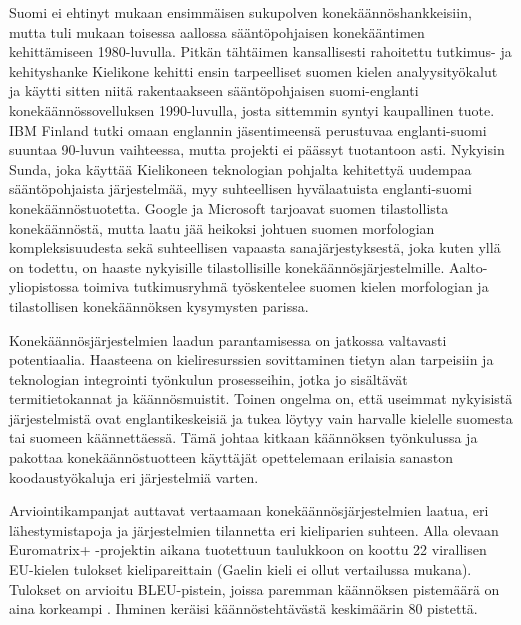 \documentclass[]{../../metanetpaper}
\begin{document}
\begin{Parallel}[c]{70mm}{70mm}
{%

Suomi ei ehtinyt mukaan ensimmäisen sukupolven konekäännöshankkeisiin,
mutta tuli mukaan toisessa aallossa sääntöpohjaisen konekääntimen
kehittämiseen 1980-luvulla. Pitkän tähtäimen kansallisesti rahoitettu
tutkimus- ja kehityshanke Kielikone kehitti ensin tarpeelliset suomen
kielen analyysityökalut ja käytti sitten niitä rakentaakseen
sääntöpohjaisen suomi-englanti konekäännössovelluksen 1990-luvulla,
josta sittemmin syntyi kaupallinen tuote. IBM Finland tutki omaan
englannin jäsentimeensä perustuvaa englanti-suomi suuntaa 90-luvun
vaihteessa, mutta projekti ei päässyt tuotantoon asti. Nykyisin Sunda,
joka käyttää Kielikoneen teknologian pohjalta kehitettyä uudempaa
sääntöpohjaista järjestelmää, myy suhteellisen hyvälaatuista
englanti-suomi konekäännöstuotetta. Google ja Microsoft tarjoavat
suomen tilastollista konekäännöstä, mutta laatu jää heikoksi johtuen
suomen morfologian kompleksisuudesta sekä suhteellisen vapaasta
sanajärjestyksestä, joka kuten yllä on todettu, on haaste nykyisille
tilastollisille konekäännösjärjestelmille. Aalto-yliopistossa toimiva
tutkimusryhmä työskentelee suomen kielen morfologian ja tilastollisen
konekäännöksen kysymysten parissa.

Konekäännösjärjestelmien laadun parantamisessa on jatkossa valtavasti
potentiaalia. Haasteena on kieliresurssien sovittaminen tietyn alan
tarpeisiin ja teknologian integrointi työnkulun prosesseihin, jotka jo
sisältävät termitietokannat ja käännösmuistit. Toinen ongelma on, että
useimmat nykyisistä järjestelmistä ovat englantikeskeisiä ja tukea
löytyy vain harvalle kielelle suomesta tai suomeen käännettäessä. Tämä
johtaa kitkaan käännöksen työnkulussa ja pakottaa konekäännöstuotteen
käyttäjät opettelemaan erilaisia sanaston koodaustyökaluja eri
järjestelmiä varten.

Arviointikampanjat auttavat vertaamaan konekäännösjärjestelmien
laatua, eri lähestymistapoja ja järjestelmien tilannetta eri
kieliparien suhteen. Alla olevaan Euromatrix+ -projektin aikana
tuotettuun taulukkoon on koottu 22 virallisen EU-kielen tulokset
kielipareittain (Gaelin kieli ei ollut vertailussa mukana). Tulokset
on arvioitu BLEU-pistein, joissa paremman käännöksen pistemäärä on
aina korkeampi \cite{BLEU}. Ihminen keräisi käännöstehtävästä
keskimäärin 80 pistettä.

}
\end{Parallel}
\end{document}
